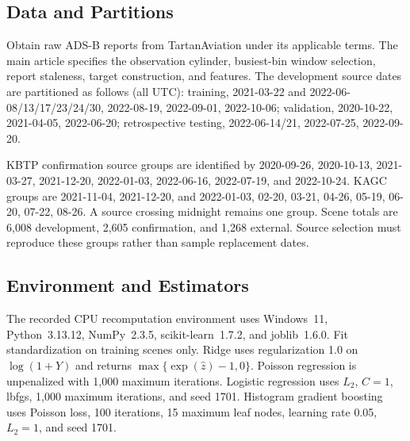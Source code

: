 \documentclass[10pt,journal,letterpaper]{IEEEtran}
\begin{document}
\subsection{Data and Partitions}
Obtain raw ADS-B reports from TartanAviation under its applicable terms. The main article specifies the observation cylinder, busiest-bin window selection, report staleness, target construction, and features. The development source dates are partitioned as follows (all UTC): training, 2021-03-22 and 2022-06-08/13/17/23/24/30, 2022-08-19, 2022-09-01, 2022-10-06; validation, 2020-10-22, 2021-04-05, 2022-06-20; retrospective testing, 2022-06-14/21, 2022-07-25, 2022-09-20.

KBTP confirmation source groups are identified by 2020-09-26, 2020-10-13, 2021-03-27, 2021-12-20, 2022-01-03, 2022-06-16, 2022-07-19, and 2022-10-24. KAGC groups are 2021-11-04, 2021-12-20, and 2022-01-03, 02-20, 03-21, 04-26, 05-19, 06-20, 07-22, 08-26. A source crossing midnight remains one group. Scene totals are 6,008 development, 2,605 confirmation, and 1,268 external. Source selection must reproduce these groups rather than sample replacement dates.

\subsection{Environment and Estimators}
The recorded CPU recomputation environment uses Windows~11, Python~3.13.12, NumPy~2.3.5, scikit-learn~1.7.2, and joblib~1.6.0. Fit standardization on training scenes only. Ridge uses regularization 1.0 on $\log(1+Y)$ and returns $\max\{\exp(\widehat z)-1,0\}$. Poisson regression is unpenalized with 1,000 maximum iterations. Logistic regression uses $L_2$, $C=1$, lbfgs, 1,000 maximum iterations, and seed 1701. Histogram gradient boosting uses Poisson loss, 100 iterations, 15 maximum leaf nodes, learning rate 0.05, $L_2=1$, and seed 1701.
\end{document}
